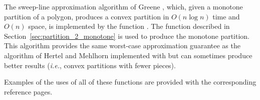 The sweep-line approximation algorithm of Greene \cite{g-dpcp-83}, which, 
given a monotone partition of a polygon, produces a convex partition in 
$O(n \log n)$ time and $O(n)$ space, is implemented
by the function %
.  The function
 described in Section~\ref{sec:partition_2_monotone}
is used to produce the monotone
partition.  This algorithm provides the same worst-case approximation guarantee 
as the algorithm of Hertel and Mehlhorn implemented with
 but can sometimes produce better
results ({\em i.e.}, convex partitions with fewer pieces).

Examples of the uses of all of these functions are provided with the
corresponding reference pages.

